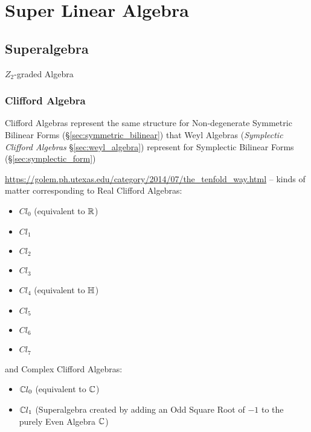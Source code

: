 \section{Super Linear Algebra}\label{sec:super_linear_algebra}

\subsection{Superalgebra}\label{sec:superalgebra}

$Z_2$-graded Algebra



\subsubsection{Clifford Algebra}\label{sec:clifford_algebra}

Clifford Algebras represent the same structure for Non-degenerate Symmetric
Bilinear Forms (\S\ref{sec:symmetric_bilinear}) that Weyl Algebras
(\emph{Symplectic Clifford Algebras} \S\ref{sec:weyl_algebra}) represent for
Symplectic Bilinear Forms (\S\ref{sec:symplectic_form})

\url{https://golem.ph.utexas.edu/category/2014/07/the_tenfold_way.html} -- kinds
of matter corresponding to Real Clifford Algebras:
\begin{itemize}
\item $Cl_0$ (equivalent to $\mathbb{R}$)
\item $Cl_1$
\item $Cl_2$
\item $Cl_3$
\item $Cl_4$ (equivalent to $\mathbb{H}$)
\item $Cl_5$
\item $Cl_6$
\item $Cl_7$
\end{itemize}
and Complex Clifford Algebras:
\begin{itemize}
\item $\mathbb{C}{l}_0$ (equivalent to $\mathbb{C}$)
\item $\mathbb{C}{l}_1$ (Superalgebra created by adding an Odd Square Root of $-1$
  to the purely Even Algebra $\mathbb{C}$)
\end{itemize}

